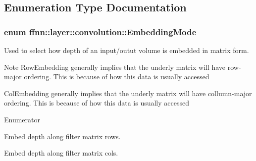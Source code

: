 \subsection{Enumeration Type Documentation}
\hypertarget{namespaceffnn_1_1layer_1_1convolution_ad420d4eb8edd7c254d1f0aaaad81017f}{
\subsubsection[{Embedding\-Mode}]{\setlength{\rightskip}{0pt plus 5cm}enum {\bf ffnn\-::layer\-::convolution\-::\-Embedding\-Mode}}}\label{namespaceffnn_1_1layer_1_1convolution_ad420d4eb8edd7c254d1f0aaaad81017f}


Used to select how depth of an input/outut volume is embedded in matrix form. 

\begin{DoxyNote}{Note}
{\ttfamily Row\-Embedding} generally implies that the underly matrix will have row-\/major ordering. This is because of how this data is usually accessed 

{\ttfamily Col\-Embedding} generally implies that the underly matrix will have collumn-\/major ordering. This is because of how this data is usually accessed 
\end{DoxyNote}
\begin{Desc}
\item[Enumerator]\par
\begin{description}
\item[{\em 
\hypertarget{namespaceffnn_1_1layer_1_1convolution_ad420d4eb8edd7c254d1f0aaaad81017fa1c03b5145e31615496457aa687a180c2}{Row\-Embedding}\label{namespaceffnn_1_1layer_1_1convolution_ad420d4eb8edd7c254d1f0aaaad81017fa1c03b5145e31615496457aa687a180c2}
}]Embed depth along filter matrix rows. \item[{\em 
\hypertarget{namespaceffnn_1_1layer_1_1convolution_ad420d4eb8edd7c254d1f0aaaad81017fae2ba27e8fa1aed3f003e54947f37d17e}{Col\-Embedding}\label{namespaceffnn_1_1layer_1_1convolution_ad420d4eb8edd7c254d1f0aaaad81017fae2ba27e8fa1aed3f003e54947f37d17e}
}]Embed depth along filter matrix cols. \end{description}
\end{Desc}


